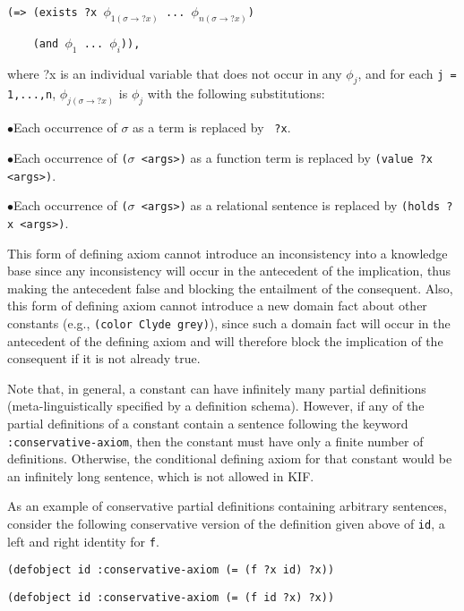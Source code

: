 \medskip
{\tt (=> (exists ?x  $\phi_{1(\sigma \rightarrow ?x)}$ ... $\phi_{n(\sigma \rightarrow ?x)}$)}\par
{\tt \ \ \ \ (and $\phi_1$ ... $\phi_i$)),}
\medskip

where ?x is an individual variable that does not occur in any $\phi_j$, and
for each {\tt j = 1,...,n}, $\phi_{j(\sigma \rightarrow ?x)}$ is $\phi_j$ with the
following substitutions:

\medskip

\item {$\bullet$}Each occurrence of $\sigma$ as a term is replaced by {\tt
?x}.

\item {$\bullet$}Each occurrence of {\tt ($\sigma$ <args>)} as a function term
is replaced by {\tt (value ?x <args>)}.

\item {$\bullet$}Each occurrence of {\tt ($\sigma$ <args>)} as a relational
sentence is replaced by {\tt (holds ?x <args>)}.

\medskip

This form of defining axiom cannot introduce an inconsistency into a knowledge base since any inconsistency will occur in the antecedent of the implication, thus making the antecedent false and blocking the entailment of the consequent.  Also, this form of defining axiom cannot introduce a new domain fact about other constants (e.g., {\tt (color Clyde grey)}), since such a domain fact will occur in the antecedent of the defining axiom and will therefore block the implication of the consequent if it is not already true.

Note that, in general, a constant can have infinitely many partial definitions
(meta-linguistically specified by a definition schema).  However, if any of
the partial definitions of a constant contain a sentence following the keyword 
{\tt :conservative-axiom}, then the constant must have only a finite number of
definitions.  Otherwise, the conditional defining axiom for that constant
would be an infinitely long sentence, which is not allowed in KIF.

As an example of conservative partial definitions containing arbitrary 
sentences, consider the following conservative version of the definition given
above of {\tt id}, a left and right identity for {\tt f}.  

\medskip
{\tt (defobject id :conservative-axiom (= (f ?x id) ?x))}
\medskip

\medskip
{\tt (defobject id :conservative-axiom (= (f id ?x) ?x))}
\medskip

